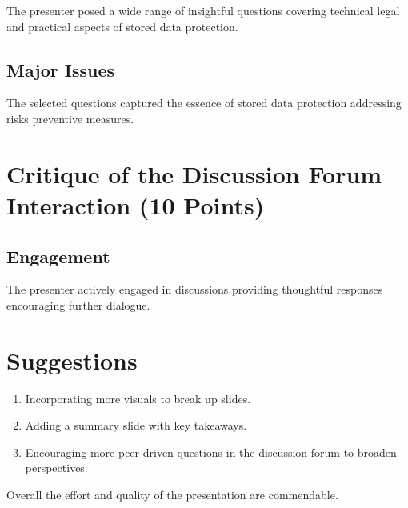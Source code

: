 \documentclass{article}
\begin{document}
The presenter posed a wide range of insightful questions covering technical legal and practical aspects of stored data protection. 

\subsection*{Major Issues}

The selected questions captured the essence of stored data protection addressing risks preventive measures. 

\section*{Critique of the Discussion Forum Interaction (10 Points)}

\subsection*{Engagement}

The presenter actively engaged in discussions providing thoughtful responses encouraging further dialogue. 

\section*{Suggestions}

\begin{enumerate}
    \item Incorporating more visuals to break up slides.
    \item Adding a summary slide with key takeaways.
    \item Encouraging more peer-driven questions in the discussion forum to broaden perspectives.
\end{enumerate}

Overall the effort and quality of the presentation are commendable.
\end{document}
